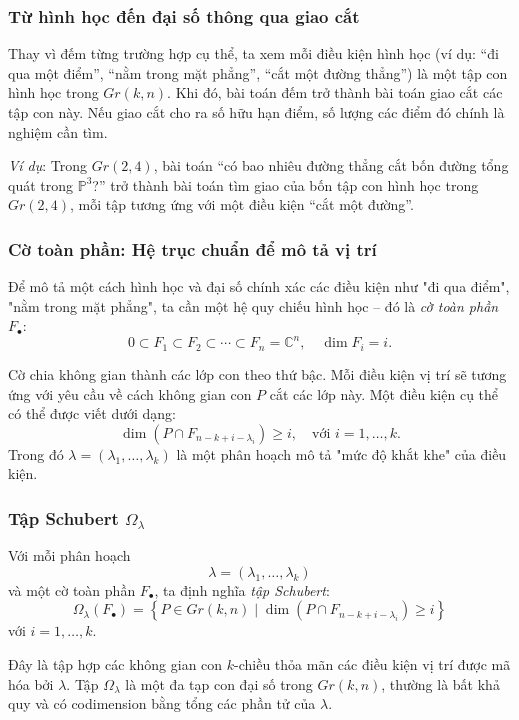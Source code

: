 \subsubsection{\textbf{Từ hình học đến đại số thông qua giao cắt}}
Thay vì đếm từng trường hợp cụ thể, ta xem mỗi điều kiện hình học (ví dụ: “đi qua một điểm”, “nằm trong mặt phẳng”, “cắt một đường thẳng”) là một tập con hình học trong $Gr(k,n)$. Khi đó, bài toán đếm trở thành bài toán giao cắt các tập con này. Nếu giao cắt cho ra số hữu hạn điểm, số lượng các điểm đó chính là nghiệm cần tìm.

\textit{Ví dụ}: Trong $Gr(2,4)$, bài toán “có bao nhiêu đường thẳng cắt bốn đường tổng quát trong $\mathbb{P}^3$?” trở thành bài toán tìm giao của bốn tập con hình học trong $Gr(2,4)$, mỗi tập tương ứng với một điều kiện “cắt một đường”.

\subsubsection{\textbf{Cờ toàn phần: Hệ trục chuẩn để mô tả vị trí}}
Để mô tả một cách hình học và đại số chính xác các điều kiện như "đi qua điểm", "nằm trong mặt phẳng", ta cần một hệ quy chiếu hình học – đó là \textit{cờ toàn phần} $F_\bullet$:
\[ 0 \subset F_1 \subset F_2 \subset \cdots \subset F_n = \mathbb{C}^n, \quad \dim F_i = i. \]

Cờ chia không gian thành các lớp con theo thứ bậc. Mỗi điều kiện vị trí sẽ tương ứng với yêu cầu về cách không gian con $P$ cắt các lớp này. Một điều kiện cụ thể có thể được viết dưới dạng:
\[ \dim(P \cap F_{n - k + i - \lambda_i}) \geq i, \quad \text{với } i = 1,\dots,k. \]
Trong đó $\lambda = (\lambda_1, \dots, \lambda_k)$ là một phân hoạch mô tả "mức độ khắt khe" của điều kiện.

\subsubsection{\textbf{Tập Schubert $\Omega_\lambda$}}
Với mỗi phân hoạch 
$$\lambda = (\lambda_1, \dots, \lambda_k)$$
và một cờ toàn phần $F_\bullet$, ta định nghĩa \textit{tập Schubert}:
$$
\Omega_\lambda(F_\bullet) = \left\{ P \in Gr(k,n) \mid \dim(P \cap F_{n-k+i - \lambda_i}) \geq i\right\}
$$
với $i = 1, \dots, k$.

Đây là tập hợp các không gian con $k$-chiều thỏa mãn các điều kiện vị trí được mã hóa bởi $\lambda$. Tập $\Omega_\lambda$ là một đa tạp con đại số trong $Gr(k,n)$, thường là bất khả quy và có codimension bằng tổng các phần tử của $\lambda$.


